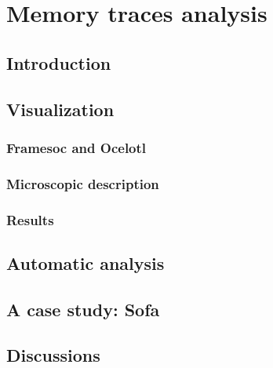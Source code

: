 \chapter{Memory traces analysis}


\section{Introduction}


\section{Visualization}

\subsection{Framesoc and Ocelotl}

\subsection{Microscopic description}

\subsection{Results}

\section{Automatic analysis}


\section{A case study: Sofa}



\section{Discussions}

